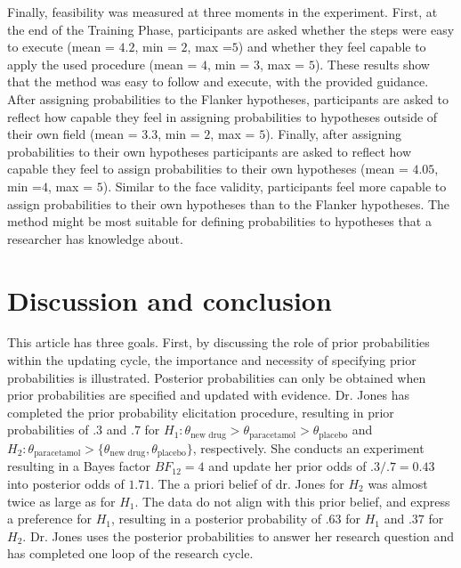 \documentclass[man]{apa6}
\begin{document}
Finally, feasibility was measured at three moments in the experiment.
First, at the end of the Training Phase, participants are asked whether the steps were easy to execute (mean = $4.2$, min = $2$, max =$5$) and whether they feel capable to apply the used procedure (mean = $4$, min = $3$, max = $5$).
These results show that the method was easy to follow and execute, with the provided guidance.
After assigning probabilities to the Flanker hypotheses, participants are asked to reflect how capable they feel in assigning probabilities to hypotheses outside of their own field (mean = $3.3$, min = $2$, max = $5$).
Finally, after assigning probabilities to their own hypotheses participants are asked to reflect how capable they feel to assign probabilities to their own hypotheses (mean = $4.05$, min =$4$, max = $5$).
Similar to the face validity, participants feel more capable to assign probabilities to their own hypotheses than to the Flanker hypotheses.
The method might be most suitable for defining probabilities to hypotheses that a researcher has knowledge about.

\section{Discussion and conclusion}
This article has three goals.
First, by discussing the role of prior probabilities within the updating cycle, the importance and necessity of specifying prior probabilities is illustrated.
Posterior probabilities can only be obtained when prior probabilities are specified and updated with evidence.
Dr. Jones has completed the prior probability elicitation procedure, resulting in prior probabilities of $.3$ and $.7$ for  $H_1: \theta_\text{new drug} > \theta_\text{paracetamol} > \theta_\text{placebo}$ and $H_2: \theta_\text{paracetamol} > \{ \theta_\text{new drug}, \theta_\text{placebo} \}$, respectively. 
She conducts an experiment resulting in a Bayes factor $BF_{12} = 4$ and update her prior odds of $.3/.7=0.43$ into posterior odds of $1.71$.
The a priori belief of dr. Jones for $H_2$ was almost twice as large as for $H_1$.
The data do not align with this prior belief, and express a preference for $H_1$, resulting in a posterior probability of $.63$ for $H_1$ and $.37$ for $H_2$.
Dr. Jones uses the posterior probabilities to answer her research question and has completed one loop of the research cycle.
\end{document}
